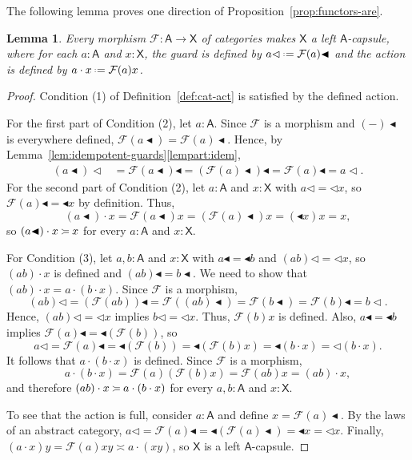 \documentclass{amsart}
\newcommand{\tin}{:}
\newcommand{\Cat}[1]{\mathsf{#1}}
\newcommand{\cat}[1]{\Cat{#1}}
\newcommand{\acat}[1]{\mathsf{#1}}
\numberwithin{lstfloat}{section}
\newcommand{\srcfunc}{\mathbin{\blacktriangleleft}}
\newcommand{\tgtfunc}{\mathbin{\blacktriangleleft}}
\newcommand{\src}[1]{#1\srcfunc}
\newcommand{\tgt}[1]{\tgtfunc #1}
\newcommand{\defeq}{\mathrel{\hstretch{.13}{=}\hspace{.2ex}{=}}}
\newcommand{\func}[1]{\mathcal{#1}}
\newcommand{\fF}{\func{F}}
\newcommand{\cA}{\cat{A}}
\newcommand{\cX}{\cat{X}}
\newcommand{\venturi}{%
  \mathrel{
    \begin{tikzpicture}[yscale=0.6,xscale=0.5]
        \draw (0ex,2.5ex) to (1ex,2ex);
        \draw (1ex,2ex) to (3ex,2ex);
        \draw (0ex,0.75ex) to (1ex,1.25ex);
        \draw (1ex,1.25ex) to (3ex,1.25ex);
    \end{tikzpicture}
  }
}
\newtheorem{lem}[thm]{Lemma}
\theoremstyle{definition}
\theoremstyle{remark}
\numberwithin{equation}{section}
\begin{document}
The following lemma proves one direction of Proposition~\ref{prop:functors-are}.
  
\begin{lem}
  \label{lem:induced-act}
    Every morphism $\fF:\cA\to\cX$ of categories makes $\cX$ a left 
$\acat{A}$-capsule,
    where for each $a:\cA$ and $x:\cX$, the guard is defined by
    $\text{$a\lhd\defeq\src{\fF(a)}$}$ and the action is defined by $a\cdot
    x\defeq \fF(a)x$. 
\end{lem}

\begin{proof}
Condition (1) of Definition~\ref{def:cat-act} is satisfied by the defined action.

  For the first part of Condition (2), let $a\tin\acat{A}$. Since $\func{F}$ is
  a morphism and $\src{(-)}$ is everywhere defined,
  $\func{F}(\src{a})=\src{\func{F}(a)}$. Hence, by
  Lemma~\ref{lem:idempotent-guards}\ref{lempart:idem}, 
  \begin{align*}
    (\src{a})\lhd & = \src{\func{F}(\src{a})} = \src{(\src{\func{F}(a)})} = \src{\func{F}(a)} = a\!\lhd.
  \end{align*}
  For the second part of Condition (2), let $a\tin\acat{A}$ and $x\tin\acat{X}$
  with $a\lhd=\lhd x$, so $\src{\func{F}(a)} =\tgt{x}$ by definition. Thus,
  $$(\src{a}) \cdot x = \func{F}(\src{a})x = (\src{\func{F}(a)})x = (\tgt{x}) x =
  x,$$ so $(\src{a})\cdot x\venturi x$ for every $a:\acat{A}$ and $x:\acat{X}$. 

  For Condition (3), let $a,b\tin\acat{A}$ and $x\tin\acat{X}$ with $\src{a} =
  \tgt{b}$ and $(ab)\lhd=\lhd x$, so $(ab)\cdot x$ is defined and
  $\src{(ab)}=\src{b}$. We need to show that $(ab)\cdot x=a\cdot (b\cdot x)$.
  Since $\func{F}$ is a morphism, 
  $$
    (ab)\lhd=\src{(\func{F}(ab))}=\func{F}(\src{(ab)})=\func{F}(\src{b})=\src{\func{F}(b)}=b\lhd.
  $$ 
  Hence, $(ab)\lhd=\lhd x$ implies $b\lhd =\lhd x$. Thus, $\func{F}(b)x$ is
  defined. Also,  $\src{a} = \tgt{b}$ implies $\src{\func{F}(a)} =
  \tgt{(\func{F}(b))}$, so
  \[
    a \lhd = \src{\func{F}(a)} = \tgt{(\func{F}(b))} =\tgt{(\func{F}(b)x)}=\tgt{(b\cdot x)}=\lhd (b\cdot x).
  \]
  It follows that $a\cdot (b\cdot x)$ is defined. Since $\func{F}$ is a
  morphism, 
  $$
    a\cdot (b\cdot x) = \func{F}(a)(\func{F}(b)x) = \func{F}(ab)x = (ab)\cdot x,
  $$ 
  and therefore $(ab)\cdot x \venturi a\cdot (b\cdot x)$ for every
  $a,b\tin\acat{A}$ and $x\tin\acat{X}$.

  To see that the action is full, consider  $a\tin \acat{A}$ and define
  $x=\src{\func{F}(a)}$. By the laws of an abstract category,  
  $a \lhd = \src{\func{F}(a)} = \tgt{({\src{\func{F}(a)}})} = \tgt{x} = \lhd x$.
  Finally, $(a\cdot x)y=\fF(a)xy\asymp a\cdot (xy)$, so $\cX$ is a left
  $\cat{A}$-capsule.
\end{proof}
\end{document}
